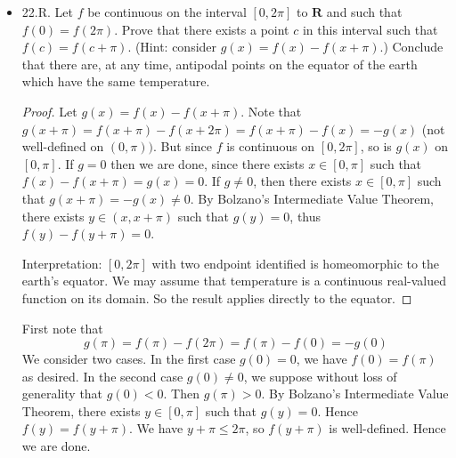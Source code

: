 \begin{itemize}
	\item 22.R. Let $f$ be continuous on the interval $[0,2 \pi]$ to $\boldsymbol{R}$ and such that $f(0)=f(2 \pi)$. Prove that there exists a point $c$ in this interval such that $f(c)=f(c+\pi)$. (Hint: consider $g(x)=f(x)-f(x+\pi)$.) Conclude that there are, at any time, antipodal points on the equator of the earth which have the same temperature.
\begin{proof}
	Let $g(x) = f(x) - f(x+\pi)$. Note that {\color{red}$g(x+\pi) = f(x+\pi) - f(x+2 \pi) = f(x+\pi) - f(x) = - g(x)$ (not well-defined on $(0,\pi))$.}
	But since $f$ is continuous on $[0,2 \pi]$, so is $g(x)$ on $[0,\pi]$. If $g = 0$ then we are done, since there exists $x \in [0,\pi]$ such that $f(x) - f(x+\pi) = g(x) = 0$. If $g  \neq 0$, then there exists $x \in [0,\pi]$ such that $g(x+\pi) = - g(x) \neq  0$. By Bolzano's Intermediate Value Theorem, there exists $y \in (x, x+\pi)$ such that $g(y) = 0$, thus $f(y) - f(y+\pi) = 0$.

	Interpretation: $[0,2 \pi]$ with two endpoint identified is homeomorphic to the earth's equator. We may assume that temperature is a continuous real-valued function on its domain. So the result applies directly to the equator.
\end{proof}
\begin{correction}
	First note that
	\[
		g(\pi) = f(\pi) - f(2 \pi) = f(\pi) - f(0) = - g(0)
	\]
	We consider two cases. In the first case $g(0) = 0$, we have $f(0) = f(\pi)$ as desired. In the second case $g(0)\neq 0$, we suppose without loss of generality that $g(0) < 0$. Then $g(\pi) > 0$. By Bolzano's Intermediate Value Theorem, there exists $y \in [0, \pi]$ such that $g(y) = 0$. Hence $f(y) = f(y + \pi)$. We have $y + \pi \le  2 \pi$, so $f(y + \pi)$ is well-defined. Hence we are done.
\end{correction}




\end{itemize}
